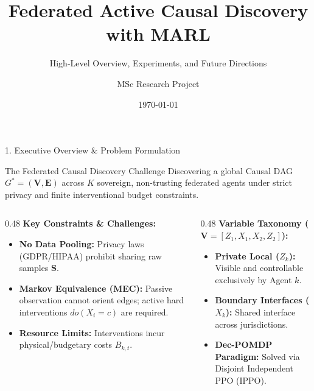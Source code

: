 \documentclass[aspectratio=169, 10pt]{beamer}
\title[Federated Causal Discovery]{Federated Active Causal Discovery with MARL}
\subtitle{High-Level Overview, Experiments, and Future Directions}
\author[Brian Ezi]{MSc Research Project}
\institute[MSc]{Federated Active Causal Discovery Team}
\date{\today}
\begin{document}
\begin{frame}
  \titlepage
\end{frame}

\begin{frame}{1. Executive Overview \& Problem Formulation}
  \begin{block}{The Federated Causal Discovery Challenge}
    Discovering a global Causal DAG $G^* = (\mathbf{V}, \mathbf{E})$ across $K$ sovereign, non-trusting federated agents under strict privacy and finite interventional budget constraints.
  \end{block}

  \begin{columns}[T]
    \begin{column}{0.48\textwidth}
      \textbf{Key Constraints \& Challenges:}
      \begin{itemize}
        \item \textbf{No Data Pooling:} Privacy laws (GDPR/HIPAA) prohibit sharing raw samples $\mathbf{S}$.
        \item \textbf{Markov Equivalence (MEC):} Passive observation cannot orient edges; active hard interventions $do(X_i = c)$ are required.
        \item \textbf{Resource Limits:} Interventions incur physical/budgetary costs $B_{k,t}$.
      \end{itemize}
    \end{column}
    
    \begin{column}{0.48\textwidth}
      \textbf{Variable Taxonomy ($\mathbf{V} = [Z_1, X_1, X_2, Z_2]$):}
      \begin{itemize}
        \item \textbf{Private Local ($Z_k$):} Visible and controllable exclusively by Agent $k$.
        \item \textbf{Boundary Interfaces ($X_k$):} Shared interface across jurisdictions.
        \item \textbf{Dec-POMDP Paradigm:} Solved via Disjoint Independent PPO (IPPO).
      \end{itemize}
    \end{column}
  \end{columns}
\end{frame}
\end{document}
